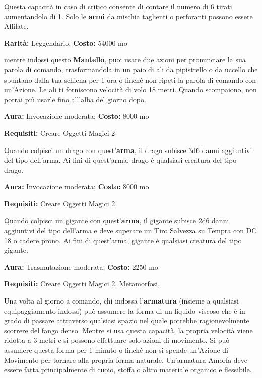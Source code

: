 \begin{multicols}{2}
Questa capacità in caso di critico consente di contare il numero di 6 tirati aumentandolo di 1. Solo le \textbf{armi} da mischia taglienti o perforanti possono essere Affilate.


\textbf{Rarità:} Leggendario; \textbf{Costo:} 54000 mo

mentre indossi questo \textbf{Mantello}, puoi usare due azioni per pronunciare la sua parola di comando, trasformandola in un paio di ali da pipistrello o da uccello che spuntano dalla tua schiena per 1 ora o finché non ripeti la parola di comando con un'Azione. Le ali ti forniscono velocità di volo 18 metri. Quando scompaiono, non potrai più usarle fino all'alba del giorno dopo.


\textbf{Aura:} Invocazione moderata; \textbf{Costo:} 8000 mo

\textbf{Requisiti:} Creare Oggetti Magici 2

Quando colpisci un drago con quest'\textbf{arma}, il drago subisce 3d6 danni aggiuntivi del tipo dell'arma. Ai fini di quest'arma, drago è qualsiasi creatura del tipo drago.


\textbf{Aura:} Invocazione moderata; \textbf{Costo:} 8000 mo

\textbf{Requisiti:} Creare Oggetti Magici 2

Quando colpisci un gigante con quest'\textbf{arma}, il gigante subisce 2d6 danni aggiuntivi del tipo dell'arma e deve superare un Tiro Salvezza su Tempra con DC 18 o cadere prono. Ai fini di quest'arma, gigante è qualsiasi creatura del tipo gigante.


\textbf{Aura:} Trasmutazione moderata; \textbf{Costo:} 2250 mo

\textbf{Requisiti:} Creare Oggetti Magici 2, Metamorfosi,

Una volta al giorno a comando, chi indossa l'\textbf{armatura} (insieme a qualsiasi equipaggiamento indossi) può assumere la forma di un liquido viscoso che è in grado di passare attraverso qualsiasi spazio nel quale potrebbe ragionevolmente scorrere del fango denso. Mentre si usa questa capacità, la propria velocità viene ridotta a 3 metri e si possono effettuare solo azioni di movimento. Si può assumere questa forma per 1 minuto o finché non si spende un'Azione di Movimento per tornare alla propria forma naturale. Un'armatura Amorfa deve essere fatta principalmente di cuoio, stoffa o altro materiale organico e flessibile.


\end{multicols}
